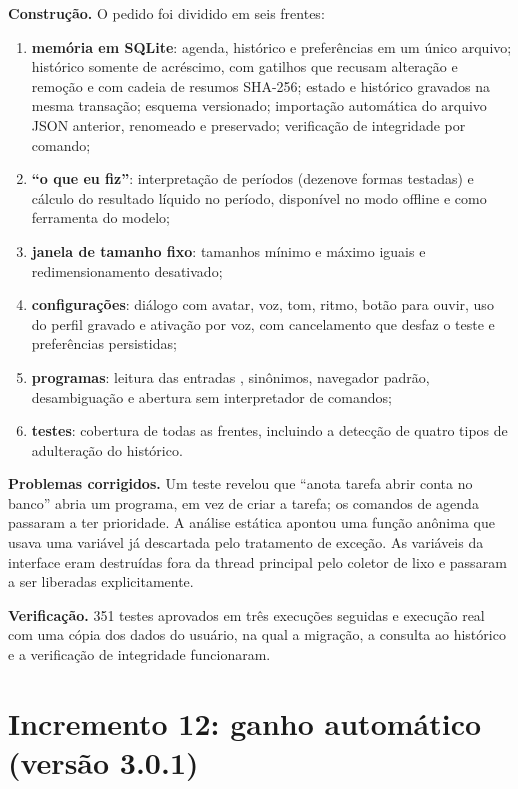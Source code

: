 \textbf{Construção.} O pedido foi dividido em seis frentes:
\begin{enumerate}[label=\alph*)]
  \item \textbf{memória em SQLite}: agenda, histórico e preferências em um único arquivo; histórico
        somente de acréscimo, com gatilhos que recusam alteração e remoção e com cadeia de resumos SHA-256;
        estado e histórico gravados na mesma transação; esquema versionado; importação automática do
        arquivo JSON anterior, renomeado e preservado; verificação de integridade por comando;
  \item \textbf{“o que eu fiz”}: interpretação de períodos (dezenove formas testadas) e cálculo do
        resultado líquido no período, disponível no modo offline e como ferramenta do modelo;
  \item \textbf{janela de tamanho fixo}: tamanhos mínimo e máximo iguais e redimensionamento desativado;
  \item \textbf{configurações}: diálogo com avatar, voz, tom, ritmo, botão para ouvir, uso do perfil
        gravado e ativação por voz, com cancelamento que desfaz o teste e preferências persistidas;
  \item \textbf{programas}: leitura das entradas , sinônimos, navegador padrão,
        desambiguação e abertura sem interpretador de comandos;
  \item \textbf{testes}: cobertura de todas as frentes, incluindo a detecção de quatro tipos de
        adulteração do histórico.
\end{enumerate}

\textbf{Problemas corrigidos.} Um teste revelou que “anota tarefa abrir conta no banco” abria um
programa, em vez de criar a tarefa; os comandos de agenda passaram a ter prioridade. A análise estática
apontou uma função anônima que usava uma variável já descartada pelo tratamento de exceção. As
variáveis da interface eram destruídas fora da thread principal pelo coletor de lixo e passaram a ser
liberadas explicitamente.

\textbf{Verificação.} 351 testes aprovados em três execuções seguidas e execução real com uma cópia dos
dados do usuário, na qual a migração, a consulta ao histórico e a verificação de integridade
funcionaram.

\section{Incremento 12: ganho automático (versão 3.0.1)}

